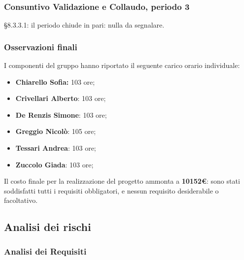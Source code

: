 \subsubsection{Consuntivo Validazione e Collaudo, periodo 3}

\S 8.3.3.1: il periodo chiude in pari: nulla da segnalare.

\subsubsection{Osservazioni finali}

I componenti del gruppo hanno riportato il seguente carico orario individuale:
\begin{itemize}
	\item \textbf{Chiarello Sofia:} 103 ore;
	\item \textbf{Crivellari Alberto}: 103 ore;
	\item \textbf{De Renzis Simone}: 103 ore;
	\item \textbf{Greggio Nicolò}: 105 ore;
	\item \textbf{Tessari Andrea}: 103 ore;
	\item \textbf{Zuccolo Giada}: 103 ore;
\end{itemize}

Il costo finale per la realizzazione del progetto ammonta a \textbf{10152\euro}: sono stati soddisfatti tutti i requisiti obbligatori, e nessun requisito desiderabile o facoltativo.


\subsection{Analisi dei rischi}

\subsubsection{Analisi dei Requisiti}

